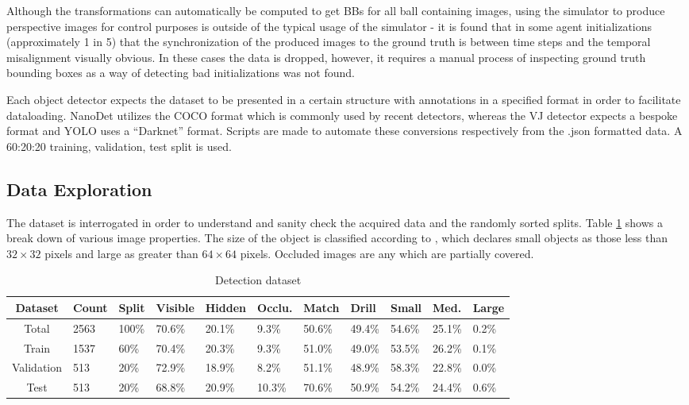 \documentclass[a4paper,twoside,12pt]{report}
\begin{document}
Although the transformations can automatically be computed to get BBs for all ball containing images, using the simulator to produce perspective images for control purposes is outside of the typical usage of the simulator - it is found that in some agent initializations (approximately 1 in 5) that the synchronization of the produced images to the ground truth is between time steps and the temporal misalignment visually obvious. In these cases the data is dropped, however, it requires a manual process of inspecting ground truth bounding boxes as a way of detecting bad initializations was not found.

Each object detector expects the dataset to be presented in a certain structure with annotations in a specified format in order to facilitate dataloading. NanoDet utilizes the COCO format \citep{cocodataset} which is commonly used by recent detectors, whereas the VJ detector expects a bespoke format \citep{vjdataset} and YOLO uses a ``Darknet'' format. Scripts are made to automate these conversions respectively from the .json formatted data. A 60:20:20 training, validation, test split is used.

\subsection{Data Exploration}
The dataset is interrogated in order to understand and sanity check the acquired data and the randomly sorted splits. Table \ref{tab:detection} shows a break down of various image properties. The size of the object is classified according to \cite{cocoeval}, which declares small objects as those less than $32\times32$ pixels and large as greater than $64\times64$ pixels. Occluded images are any which are partially covered.

\begin{table}[h!]
\fontsize{9.5pt}{12pt}\selectfont
\centering
\begin{tabular}{c|ll|lll|ll|lll}
{\bf Dataset}	&{\bf Count}	&{\bf Split}	&{\bf Visible}	&{\bf Hidden}	&{\bf Occlu.}	&{\bf Match}	&{\bf Drill}	&{\bf Small}	&{\bf Med.}	&{\bf Large}	\\\hline
Total			&2563			&100\%			&70.6\%			&20.1\%			&9.3\%			&50.6\%			&49.4\%			&54.6\%			&25.1\%			&0.2\%			\\\hline   
Train			&1537			&60\%			&70.4\%			&20.3\%			&9.3\%			&51.0\%			&49.0\%			&53.5\%			&26.2\%			&0.1\%			\\\hline  
Validation		&513			&20\%			&72.9\%			&18.9\%			&8.2\%			&51.1\%			&48.9\%			&58.3\%			&22.8\%			&0.0\%			\\\hline  
Test			&513			&20\%			&68.8\%			&20.9\%			&10.3\%			&70.6\%			&50.9\%			&54.2\%			&24.4\%			&0.6\%			\\\hline                        
\end{tabular}
\caption{Detection dataset}
\label{tab:detection}
\end{table}
\end{document}
